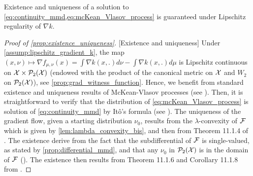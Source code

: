 
Existence and uniqueness of a solution to \cref{eq:continuity_mmd,eq:mcKean_Vlasov_process} is guaranteed under Lipschitz regularity of $\nabla k$.%
\begin{proof}[Proof of \cref{prop:existence_uniqueness}]\label{proof:prop:existence_uniqueness}[Existence and uniqueness]
Under \cref{assump:lipschitz_gradient_k}, the map $(x,\nu)\mapsto \nabla f_{\mu,\nu}(x)=\int \nabla k(x,.)d \nu - \int \nabla k(x,.) d \mu$ is Lipschitz continuous on ${{\mathcal X}} \times \mathcal{P}_2({{\mathcal X}})$ (endowed with the product of the canonical metric on ${{\mathcal X}}$ and $W_2$ on $\mathcal{P}_2({{\mathcal X}})$), see \cref{prop:grad_witness_function}. Hence, we benefit from standard existence and uniqueness results of McKean-Vlasov processes (see \cite{jourdain2007nonlinear}). Then, it is straightforward to verify that the distribution of \eqref{eq:mcKean_Vlasov_process} is solution of \eqref{eq:continuity_mmd} by Itô's formula (see \cite{ito1951stochastic}). The uniqueness of the gradient flow, given a starting distribution $\nu_0$, results from the $\lambda$-convexity of ${{\mathcal F}}$ which is given by \cref{lem:lambda_convexity_bis}, and then from Theorem 11.1.4 of \cite{ambrosio2008gradient}. The existence derive from the fact that the subdifferential of ${{\mathcal F}}$ is single-valued, as stated by \cref{prop:differential_mmd}, and that any $\nu_0$ in $\mathcal{P}_2({{\mathcal X}})$ is in the domain of ${{\mathcal F}}$ (\cite{gretton2012kernel}). The existence then results from Theorem 11.1.6 and Corollary 11.1.8 from \cite{ambrosio2008gradient}.
\end{proof}


